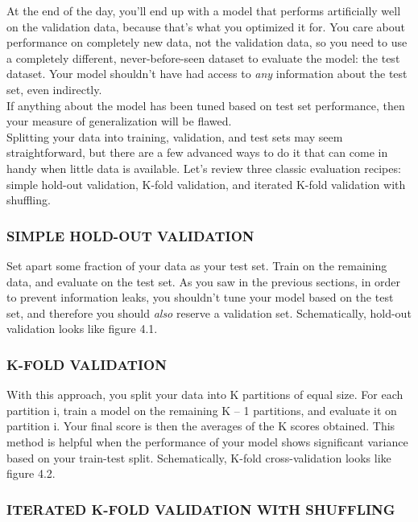 \documentclass{article}
\numberwithin{equation}{section} %
\begin{document}
At the end of the day, you’ll end up with a model that performs artificially well on
the validation data, because that’s what you optimized it for. You care about performance on completely new data, not the validation data, so you need to use a completely different, never-before-seen dataset to evaluate the model: the test dataset. Your model shouldn’t have had access to \textit{any} information about the test set, even indirectly. \\

If anything about the model has been tuned based on test set performance, then your
measure of generalization will be flawed. \\

Splitting your data into training, validation, and test sets may seem straightforward, but there are a few advanced ways to do it that can come in handy when little data is available. Let’s review three classic evaluation recipes: simple hold-out validation, K-fold validation, and iterated K-fold validation with shuffling. 

\subsubsection*{SIMPLE HOLD-OUT VALIDATION}

Set apart some fraction of your data as your test set. Train on the remaining data, and evaluate on the test set. As you saw in the previous sections, in order to prevent information leaks, you shouldn’t tune your model based on the test set, and therefore you should \textit{also} reserve a validation set. Schematically, hold-out validation looks like figure 4.1.


\subsubsection*{K-FOLD VALIDATION}

With this approach, you split your data into K partitions of equal size. For each partition i, train a model on the remaining K – 1 partitions, and evaluate it on partition i. Your final score is then the averages of the K scores obtained. This method is helpful when the performance of your model shows significant variance based on your train-test split. Schematically, K-fold cross-validation looks like figure 4.2. \\

\subsubsection*{ITERATED K-FOLD VALIDATION WITH SHUFFLING}
\end{document}
